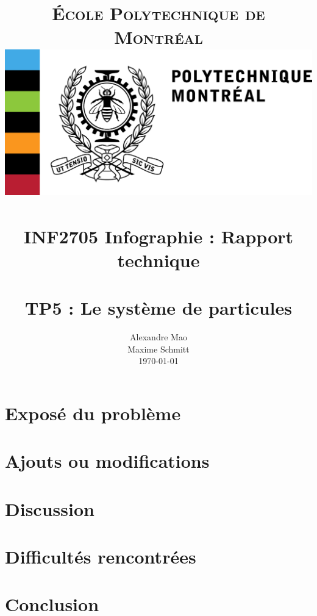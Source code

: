 \documentclass[toc=left, paper=letterpaper, fontsize=12pt]{scrartcl}
\title{
        \usefont{OT1}{bch}{b}{n}
        \normalfont \normalsize \textsc{École Polytechnique de Montréal} \\ [25pt]
        \includegraphics[scale=0.70]{poly} \\
        \vspace*{\fill}
        \horrule{0.5pt} \\[0.4cm]
        \huge INF2705 Infographie : Rapport technique \\
        \horrule{2pt} \\[0.5cm]
        \LARGE TP5 : Le système de particules
	    \vfill
}
\author{
        \normalfont                                 \normalsize
        \large  Alexandre Mao	\qquad	1813566\\[-3pt] \normalsize
        \large Maxime Schmitt	\qquad	1719088\\[-3pt]      \normalsize
        \today
}
\date{}
\numberwithin{equation}{section}        %
\numberwithin{figure}{section}          %
\numberwithin{table}{section}               %
\begin{document}
\maketitle

%	
\clearpage



\section{Exposé du problème}
\label{sec:expose}


\section{Ajouts ou modifications}
\label{sec:ajouts}


\section{Discussion}
\label{sec:discussion}


\section{Difficultés rencontrées}
\label{sec:difficultes}


\section{Conclusion}
\label{sec:conclusion}


\clearpage

\appendix


\clearpage





\end{document}
